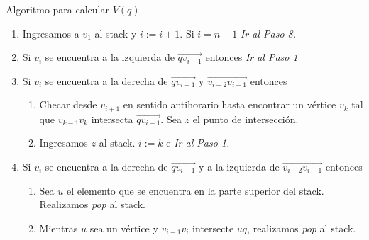\documentclass[aspectratio=169,xcolor=dvipsnames, t]{beamer}
\begin{document}
\begin{frame}{Algoritmo para calcular $V(q)$}
    \begin{enumerate}
            \item Ingresamos a $v_{1}$ al stack y $i := i + 1$. Si $i = n + 1$ \textit{Ir al Paso 8.}
            \item Si $v_{i}$ se encuentra a la izquierda de $\overrightarrow{qv_{i-1}}$ entonces \textit{Ir al Paso 1}
            \item Si $v_{i}$ se encuentra a la derecha de $\overrightarrow{qv_{i-1}}$ y $\overrightarrow{v_{i-2}v_{i-1}}$ entonces
                \begin{enumerate}
                    \item Checar desde $v_{i+1}$ en sentido antihorario hasta encontrar un vértice $v_{k}$ tal que $v_{k-1}v_{k}$ intersecta $\overrightarrow{qv_{i-1}}$. Sea $z$ el punto de intersección.
                    \item Ingresamos $z$ al stack. $i := k$ e \textit{Ir al Paso 1.}
                \end{enumerate}
            \item Si $v_{i}$ se encuentra a la derecha de $\overrightarrow{qv_{i-1}}$ y a la izquierda de $\overrightarrow{v_{i-2}v_{i-1}}$ entonces
                \begin{enumerate}
                    \item Sea $u$ el elemento que se encuentra en la parte superior del stack. Realizamos \textit{pop} al stack.
                    \item Mientras $u$ sea un vértice y $v_{i-1}v_{i}$ intersecte $uq$, realizamos \textit{pop} al stack. 
                \end{enumerate}
    \end{enumerate}
\end{frame}
\end{document}
